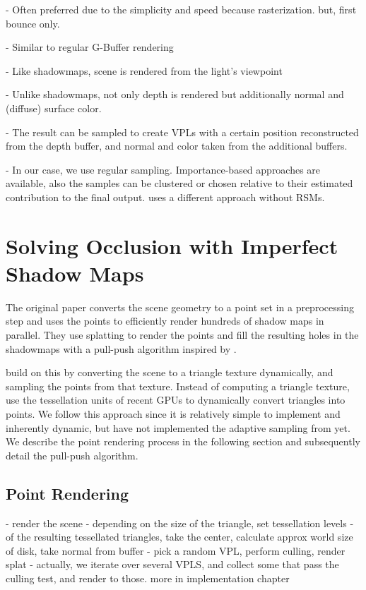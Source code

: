 - Often preferred due to the simplicity and speed because rasterization. but, first bounce only.

- Similar to regular G-Buffer rendering

- Like shadowmaps, scene is rendered from the light's viewpoint

- Unlike shadowmaps, not only depth is rendered but additionally normal and (diffuse) surface color.

- The result can be sampled to create VPLs with a certain position reconstructed from the depth buffer, and normal and color taken from the additional buffers.

- In our case, we use regular sampling. Importance-based approaches are available, also the samples can be clustered \cite{} or chosen relative to their estimated contribution to the final output. \citet{hedman2016sequential} uses a different approach without RSMs.


\section{Solving Occlusion with Imperfect Shadow Maps}
\label{sec:ISM}


The original paper \citep{ritschel2008ism} converts the scene geometry to a point set in a preprocessing step and uses the points to efficiently render hundreds of shadow maps in parallel. They use splatting to render the points and fill the resulting holes in the shadowmaps with a pull-push algorithm inspired by \citep{Marroquim:2007:reconstruction}.

\citet{ritschel2011ismsViewAdaptive} build on \citet{laine2007incremental} this by converting the scene to a triangle texture dynamically, and sampling the points from that texture. Instead of computing a triangle texture, \citet{barak2013temporally} use the tessellation units of recent GPUs to dynamically convert triangles into points. We follow this approach since it is relatively simple to implement and inherently dynamic, but have not implemented the adaptive sampling from \citet{ritschel2011ismsViewAdaptive} yet.
We describe the point rendering process in the following section and subsequently detail the pull-push algorithm.

\subsection{Point Rendering}

- render the scene
- depending on the size of the triangle, set tessellation levels
- of the resulting tessellated triangles, take the center, calculate approx world size of disk, take normal from buffer
- pick a random VPL, perform culling, render splat
- actually, we iterate over several VPLS, and collect some that pass the culling test, and render to those. more in implementation chapter

